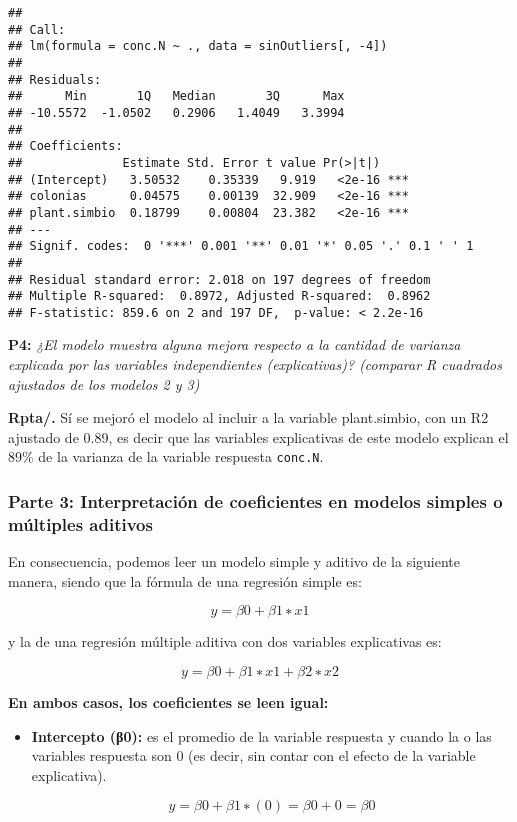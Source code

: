 \documentclass[
]{article}
\begin{document}
\begin{verbatim}
## 
## Call:
## lm(formula = conc.N ~ ., data = sinOutliers[, -4])
## 
## Residuals:
##      Min       1Q   Median       3Q      Max 
## -10.5572  -1.0502   0.2906   1.4049   3.3994 
## 
## Coefficients:
##              Estimate Std. Error t value Pr(>|t|)    
## (Intercept)   3.50532    0.35339   9.919   <2e-16 ***
## colonias      0.04575    0.00139  32.909   <2e-16 ***
## plant.simbio  0.18799    0.00804  23.382   <2e-16 ***
## ---
## Signif. codes:  0 '***' 0.001 '**' 0.01 '*' 0.05 '.' 0.1 ' ' 1
## 
## Residual standard error: 2.018 on 197 degrees of freedom
## Multiple R-squared:  0.8972, Adjusted R-squared:  0.8962 
## F-statistic: 859.6 on 2 and 197 DF,  p-value: < 2.2e-16
\end{verbatim}

\textbf{P4:} \emph{¿El modelo muestra alguna mejora respecto a la
cantidad de varianza explicada por las variables independientes
(explicativas)? (comparar R cuadrados ajustados de los modelos 2 y 3)}

\textbf{Rpta/.} Sí se mejoró el modelo al incluir a la variable
plant.simbio, con un R2 ajustado de 0.89, es decir que las variables
explicativas de este modelo explican el 89\% de la varianza de la
variable respuesta \texttt{conc.N}.

\hypertarget{parte-3-interpretaciuxf3n-de-coeficientes-en-modelos-simples-o-muxfaltiples-aditivos}{%
\subsubsection{\texorpdfstring{\textbf{Parte 3: Interpretación de
coeficientes en modelos simples o múltiples
aditivos}}{Parte 3: Interpretación de coeficientes en modelos simples o múltiples aditivos}}\label{parte-3-interpretaciuxf3n-de-coeficientes-en-modelos-simples-o-muxfaltiples-aditivos}}

En consecuencia, podemos leer un modelo simple y aditivo de la siguiente
manera, siendo que la fórmula de una regresión simple es:

\[
y=β0+β1∗x1
\]

y la de una regresión múltiple aditiva con dos variables explicativas
es:

\[
y=β0+β1∗x1+β2∗x2
\]

\textbf{En ambos casos, los coeficientes se leen igual:}

\begin{itemize}
\item
  \textbf{Intercepto (β0):} es el promedio de la variable respuesta y
  cuando la o las variables respuesta son 0 (es decir, sin contar con el
  efecto de la variable explicativa).

  \[
  y=β0+β1∗(0) = β0+0 = β0  
  \]
\end{itemize}
\end{document}

